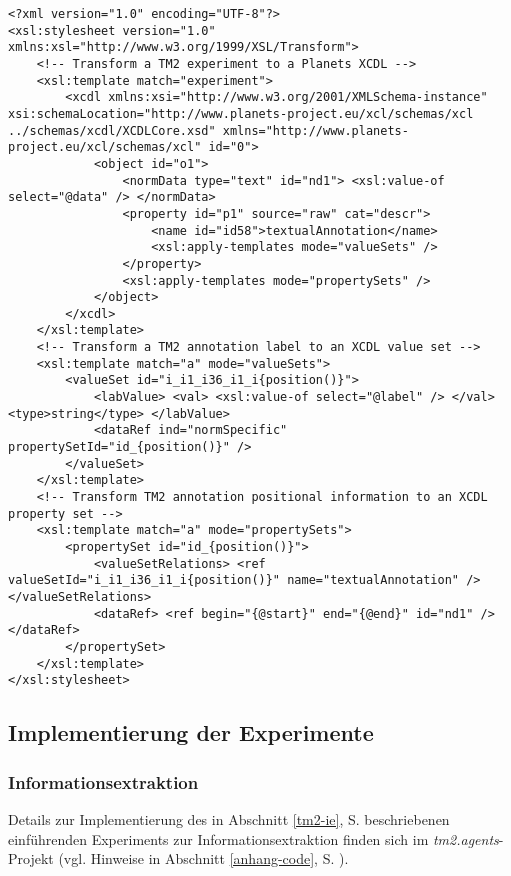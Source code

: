 \documentclass[abstracton, 12pt]{scrartcl}
\begin{document}
\lstset{language=XML}
\begin{lstlisting}
<?xml version="1.0" encoding="UTF-8"?>
<xsl:stylesheet version="1.0" xmlns:xsl="http://www.w3.org/1999/XSL/Transform">
    <!-- Transform a TM2 experiment to a Planets XCDL -->
    <xsl:template match="experiment">
        <xcdl xmlns:xsi="http://www.w3.org/2001/XMLSchema-instance" xsi:schemaLocation="http://www.planets-project.eu/xcl/schemas/xcl ../schemas/xcdl/XCDLCore.xsd" xmlns="http://www.planets-project.eu/xcl/schemas/xcl" id="0">
            <object id="o1">
                <normData type="text" id="nd1"> <xsl:value-of select="@data" /> </normData>
                <property id="p1" source="raw" cat="descr">
                    <name id="id58">textualAnnotation</name>
                    <xsl:apply-templates mode="valueSets" />
                </property>
                <xsl:apply-templates mode="propertySets" />
            </object>
        </xcdl>
    </xsl:template>
    <!-- Transform a TM2 annotation label to an XCDL value set -->
    <xsl:template match="a" mode="valueSets">
        <valueSet id="i_i1_i36_i1_i{position()}">
            <labValue> <val> <xsl:value-of select="@label" /> </val> <type>string</type> </labValue>
            <dataRef ind="normSpecific" propertySetId="id_{position()}" />
        </valueSet>
    </xsl:template>
    <!-- Transform TM2 annotation positional information to an XCDL property set -->
    <xsl:template match="a" mode="propertySets">
        <propertySet id="id_{position()}">
            <valueSetRelations> <ref valueSetId="i_i1_i36_i1_i{position()}" name="textualAnnotation" /> </valueSetRelations>
            <dataRef> <ref begin="{@start}" end="{@end}" id="nd1" /> </dataRef>
        </propertySet>
    </xsl:template>
</xsl:stylesheet>
\end{lstlisting}

\subsection{Implementierung der Experimente}

\subsubsection{Informationsextraktion} \label{anhang-ie}

Details zur Implementierung des in Abschnitt \ref{tm2-ie}, S. \pageref{tm2-ie} beschriebenen einführenden Experiments zur Informationsextraktion finden sich im \emph{tm2.agents}-Projekt (vgl. Hinweise in Abschnitt \ref{anhang-code}, S. \pageref{anhang-code}).
\end{document}
